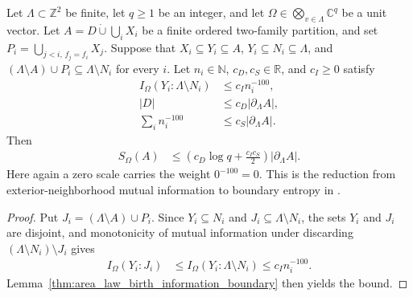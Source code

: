 \begin{lemma}
    \label{thm:area_law_neighborhood_information_boundary}
    \leanok
    Let $\Lambda\subset\mathbb Z^2$ be finite, let $q\ge1$ be an integer,
    and let $\Omega\in\bigotimes_{v\in\Lambda}\mathbb C^q$ be a unit vector.
    Let $A=D\mathbin{\dot\cup}\bigcup_iX_i$ be a finite ordered two-family
    partition, and set $P_i=\bigcup_{j<i,\,f_j=f_i}X_j$.
    Suppose that $X_i\subseteq Y_i\subseteq A$, $Y_i\subseteq N_i\subseteq\Lambda$,
    and $(\Lambda\setminus A)\cup P_i\subseteq\Lambda\setminus N_i$ for every $i$.
    Let $n_i\in\mathbb N$, $c_D,c_S\in\mathbb R$, and $c_I\ge0$ satisfy
    \begin{align*}
        I_\Omega(Y_i:\Lambda\setminus N_i) & \le c_I n_i^{-100},          \\
        |D|                                & \le c_D|\partial_\Lambda A|, \\
        \sum_i n_i^{-100}                  & \le c_S|\partial_\Lambda A|.
    \end{align*}
    Then
    \begin{align*}
        S_\Omega(A) & \le
        \left(c_D\log q+\frac{c_Ic_S}{2}\right)|\partial_\Lambda A|.
    \end{align*}
    Here again a zero scale carries the weight $0^{-100}=0$.
    This is the reduction from exterior-neighborhood mutual information to
    boundary entropy in
    \cite[Theorem~1.1, lines~815--852 of Section~11]{OpenAI2026AreaLaw}.
\end{lemma}
\begin{proof}\leanok
    Put $J_i=(\Lambda\setminus A)\cup P_i$.
    Since $Y_i\subseteq N_i$ and $J_i\subseteq\Lambda\setminus N_i$,
    the sets $Y_i$ and $J_i$ are disjoint, and monotonicity of mutual
    information under discarding $(\Lambda\setminus N_i)\setminus J_i$ gives
    \begin{align*}
        I_\Omega(Y_i:J_i) & \le I_\Omega(Y_i:\Lambda\setminus N_i)
        \le c_I n_i^{-100}.
    \end{align*}
    Lemma~\ref{thm:area_law_birth_information_boundary} then yields the
    bound.
\end{proof}
